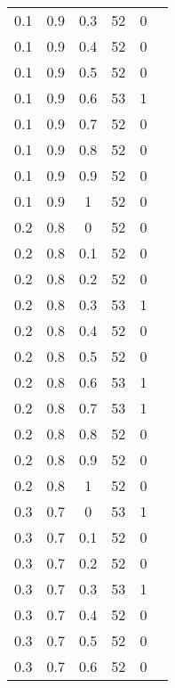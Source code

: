 \begin{table}[ht]
\begin{minipage}[h!]{0.10\hsize}
\begin{center}
{\begin{tabular}{|c@{\hspace{5mm}}|c@{\hspace{5mm}}|c@{\hspace{5mm}}|c@{\hspace{5mm}}|c@{\hspace{5mm}}|c|}
                    0.1  & 0.9  & 0.3  & 52    & 0     \\
                    0.1  & 0.9  & 0.4  & 52    & 0     \\
                    0.1  & 0.9  & 0.5  & 52    & 0     \\
                    0.1  & 0.9  & 0.6  & 53    & 1     \\
                    0.1  & 0.9  & 0.7  & 52    & 0     \\
                    0.1  & 0.9  & 0.8  & 52    & 0     \\
                    0.1  & 0.9  & 0.9  & 52    & 0     \\
                    0.1  & 0.9  & 1    & 52    & 0     \\
                    0.2  & 0.8  & 0    & 52    & 0     \\
                    0.2  & 0.8  & 0.1  & 52    & 0     \\
                    0.2  & 0.8  & 0.2  & 52    & 0     \\
                    0.2  & 0.8  & 0.3  & 53    & 1     \\
                    0.2  & 0.8  & 0.4  & 52    & 0     \\
                    0.2  & 0.8  & 0.5  & 52    & 0     \\
                    0.2  & 0.8  & 0.6  & 53    & 1     \\
                    0.2  & 0.8  & 0.7  & 53    & 1     \\
                    0.2  & 0.8  & 0.8  & 52    & 0     \\
                    0.2  & 0.8  & 0.9  & 52    & 0     \\
                    0.2  & 0.8  & 1    & 52    & 0     \\
                    0.3  & 0.7  & 0    & 53    & 1     \\
                    0.3  & 0.7  & 0.1  & 52    & 0     \\
                    0.3  & 0.7  & 0.2  & 52    & 0     \\
                    0.3  & 0.7  & 0.3  & 53    & 1     \\
                    0.3  & 0.7  & 0.4  & 52    & 0     \\
                    0.3  & 0.7  & 0.5  & 52    & 0     \\
                    0.3  & 0.7  & 0.6  & 52    & 0     \\
                    \hline
                \end{tabular}}

\end{center}
\end{minipage}
\end{table}
